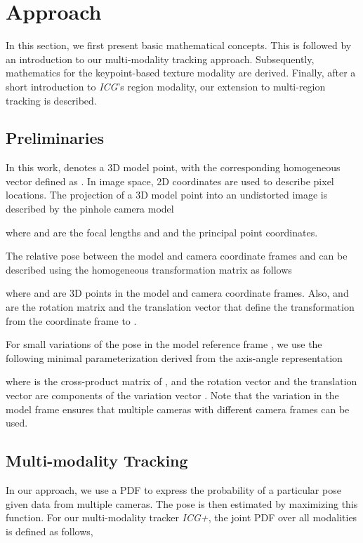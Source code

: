 \documentclass[letterpaper, 10 pt, conference]{ieeeconf}
\begin{document}
\section{Approach}\label{sec:c}
In this section, we first present basic mathematical concepts.
This is followed by an introduction to our multi-modality tracking approach.
Subsequently, mathematics for the keypoint-based texture modality are derived.
Finally, after a short introduction to \textit{ICG}'s region modality, our extension to multi-region tracking is described.



\subsection{Preliminaries}\label{sec:c0}
In this work,  denotes a 3D model point, with the corresponding homogeneous vector defined as .
In image space, 2D coordinates  are used to describe pixel locations.
The projection of a 3D model point  into an undistorted image is described by the pinhole camera model

where  and  are the focal lengths and  and  the principal point coordinates.

The relative pose between the model and camera coordinate frames  and  can be described using the homogeneous transformation matrix  as follows

where  and  are 3D points in the model and camera coordinate frames.
Also,  and  are the rotation matrix and the translation vector that define the transformation from the coordinate frame  to .

For small variations of the pose in the model reference frame , we use the following minimal parameterization derived from the axis-angle representation

where  is the cross-product matrix of , and the rotation vector  and the translation vector  are components of the variation vector .
Note that the variation in the model frame  ensures that multiple cameras with different camera frames  can be used.



\subsection{Multi-modality Tracking}\label{sec:c1}
In our approach, we use a \ac{PDF} to express the probability of a particular pose given data from multiple cameras.
The pose is then estimated by maximizing this function.
For our multi-modality tracker \textit{ICG+}, the joint \ac{PDF} over all modalities is defined as follows,
\end{document}
